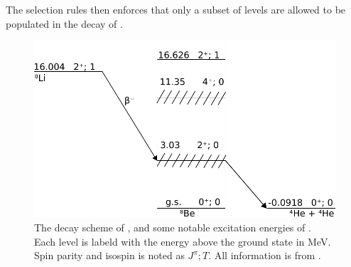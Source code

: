 The selection rules then enforces that only a subset of levels are allowed to be populated in the decay of \li. 







\begin{figure}
	\centering
	\includegraphics[width=\columnwidth]{../figures/DecayScheme.pdf}
	\caption{The decay scheme of \li, and some notable excitation energies of \ber. Each level is labeld with the energy above the \ber ground state in MeV. Spin parity and isospin is noted as $J^\pi; T$. All information is from \cite{TILLEY2004155}.}
\end{figure}
